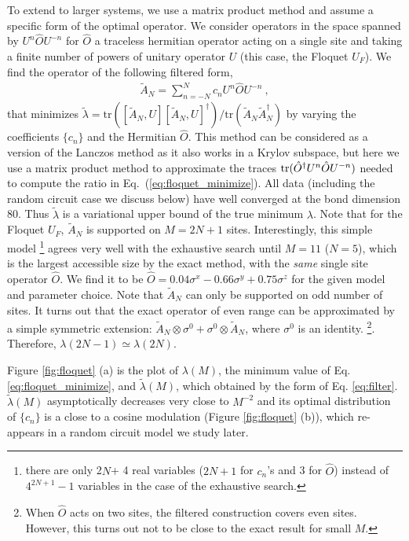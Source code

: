 \documentclass[twocolumn,superscriptaddress, prb]{revtex4-1}
\begin{document}
To extend to larger systems, we use a matrix product method and assume a specific form of the optimal operator.
We consider operators in the space spanned by $U^n \hat{O} U^{- n}$ for $\hat{O}$ a traceless hermitian operator acting on a single site
and taking a finite number of powers of unitary operator $U$ (this case, the Floquet $U_F$).
We find the operator of the following filtered form,
\begin{align}
 \tilde{A}_N=\sum_{n=-N}^N c_n U^n \hat{O} U^{- n} ~,
 \label{eq:filter}
\end{align}
that minimizes $\tilde{\lambda} = \mathrm{tr}([\tilde{A}_N,U][\tilde{A}_N,U]^\dag)/\mathrm{tr}(\tilde{A}_N\tilde{A}_N^\dag)$
by varying the coefficients $\{c_n\}$ and the Hermitian $\hat{O}$.
This method can be considered as a version of the Lanczos method as it also works in a Krylov subspace,
but here we use a matrix product method to approximate the traces ${\rm tr}(\hat{O}^\dagger U^n \hat{O} U^{-n})$ needed to compute the ratio in Eq.~(\ref{eq:floquet_minimize}). All data (including the random circuit case we discuss below) have well converged at the bond dimension 80.
Thus $\tilde{\lambda}$ is a variational upper bound of the true minimum $\lambda$.
Note that for the Floquet $U_F$, $\tilde{A}_N$ is supported on $M = 2N+1$ sites.
Interestingly, this simple model \footnote{there are only 2$N$+ 4 real variables ($2N+1$ for $c_n$'s and 3 for $\hat{O}$) instead of $4^{2N+1} - 1$ variables
in the case of the exhaustive search.}
agrees very well with the exhaustive search until $M = 11$ ($N = 5$), which is the largest accessible size by the exact method,
with the {\it same} single site operator $\hat{O}$.
We find it to be $\hat{O} = 0.04\sigma^x  - 0.66\sigma^y + 0.75\sigma^z$ for the given model and parameter choice.
Note that $\tilde{A}_N$ can only be supported on odd number of sites.
It turns out that the exact operator of even range can be approximated by a simple symmetric extension:
$\tilde{A}_N\otimes \sigma^0 + \sigma^0\otimes\tilde{A}_N$, where $\sigma^0$ is an identity.
\footnote{When $\hat{O}$ acts on two sites, the filtered construction covers even sites.
However, this turns out not to be close to the exact result for small $M$.}.
Therefore, $\lambda(2N-1) \simeq \lambda(2N)$.


Figure \ref{fig:floquet} (a) is the plot of $\lambda (M)$, the minimum value of Eq. \ref{eq:floquet_minimize}, and
$\tilde{\lambda}(M)$, which obtained by the form of Eq. \eqref{eq:filter}.
$\tilde{\lambda}(M)$ asymptotically decreases very close to $M^{-2}$
and its optimal distribution of $\{ c_n\}$ is a close to a cosine modulation (Figure \ref{fig:floquet} (b)),
which re-appears in a random circuit model we study later.
\end{document}
